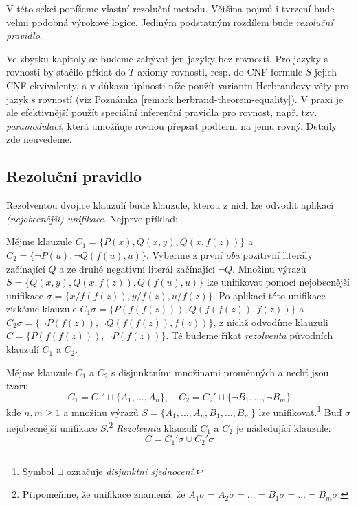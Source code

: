 V této sekci popíšeme vlastní rezoluční metodu. Většina pojmů i tvrzení bude velmi podobná výrokové logice. Jediným podstatným rozdílem bude \emph{rezoluční pravidlo}.

\begin{remark}
    Ve zbytku kapitoly se budeme zabývat jen jazyky bez rovnosti. Pro jazyky s rovností by stačilo přidat do $T$ axiomy rovnosti, resp. do CNF formule $S$ jejich CNF ekvivalenty, a v důkazu úplnosti níže použít variantu Herbrandovy věty pro jazyk s rovností (viz Poznámka \ref{remark:herbrand-theorem-equality}). V praxi je ale efektivnější použít speciální inferenční pravidla pro rovnost, např. tzv. \emph{paramodulaci}, která umožňuje rovnou přepsat podterm na jemu rovný. Detaily zde neuvedeme.
\end{remark}


\subsection{Rezoluční pravidlo}

Rezolventou dvojice klauzulí bude klauzule, kterou z nich lze odvodit aplikací \emph{(nejobecnější) unifikace}. Nejprve příklad:

\begin{example}
Mějme klauzule $C_1=\{P(x),Q(x,y),Q(x,f(z))\}$ a $C_2=\{\neg P(u),\neg Q(f(u),u)\}$. Vyberme z první \emph{oba} pozitivní literály začínající $Q$ a ze druhé negativní literál začínající $\neg Q$. Množinu výrazů $S=\{Q(x,y),Q(x,f(z)),Q(f(u),u)\}$ lze unifikovat pomocí nejobecnější unifikace $\sigma=\{x/f(f(z)),y/f(z),u/f(z)\}$. Po aplikaci této unifikace získáme klauzule $C_1\sigma=\{P(f(f(z))),Q(f(f(z)),f(z))\}$ a $C_2\sigma=\{\neg P(f(z)),\neg Q(f(f(z)),f(z))\}$, z nichž odvodíme klauzuli $C=\{P(f(f(z))),\neg P(f(z))\}$. Té budeme říkat \emph{rezolventa} původních klauzulí $C_1$ a $C_2$.
\end{example}

\begin{definition}
    Mějme klauzule $C_1$ a $C_2$ s disjunktními množinami proměnných a nechť jsou tvaru
    $$
    C_1=C_1'\sqcup \{A_1,\dots,A_n\},\quad C_2=C_2'\sqcup \{\neg B_1,\dots,\neg B_m\}
    $$
    kde $n,m\ge 1$ a množinu výrazů $S=\{A_1,\dots,A_n,B_1,\dots,B_m\}$ lze unifikovat.\footnote{Symbol $\sqcup$ označuje \emph{disjunktní sjednocení}.} Buď $\sigma$ nejobecnější unifikace $S$.\footnote{Připomeňme, že unifikace znamená, že $A_1\sigma=A_2\sigma=\dots=B_1\sigma=\dots=B_m\sigma$.} \emph{Rezolventa} klauzulí $C_1$ a $C_2$ je následující klauzule:
    $$
    C=C_1'\sigma \cup C_2'\sigma
    $$
\end{definition}

